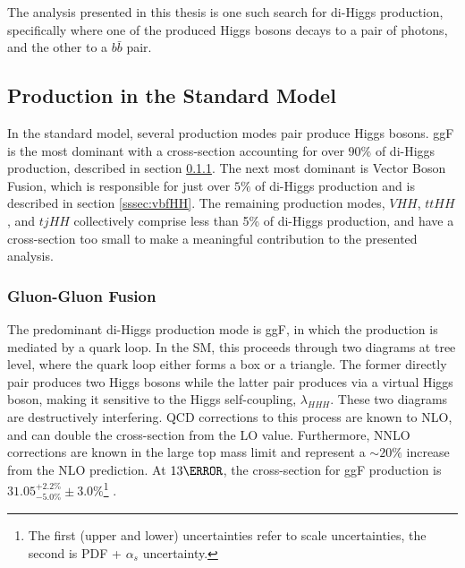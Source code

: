 The analysis presented in this thesis is one such search for di-Higgs production, specifically where one of the produced Higgs bosons decays to a pair of photons, and the other to a $b\bar{b}$ pair.

\subsection{Production in the Standard Model}
In the standard model, several production modes pair produce Higgs bosons. \gls{ggF} is the most dominant with a cross-section accounting for over $90\%$ of di-Higgs production, described in section \ref{sssec:ggfHH}. The next most dominant is Vector Boson Fusion, which is responsible for just over $5\%$ of di-Higgs production and is described in section \ref{sssec:vbfHH}. The remaining production modes, $VHH$, $ttHH$, and $tjHH$ collectively comprise less than 5\% of di-Higgs production, and have a cross-section too small to make a meaningful contribution to the presented analysis.

\subsubsection{Gluon-Gluon Fusion} \label{sssec:ggfHH}

The predominant di-Higgs production mode is \gls{ggF}, in which the production is mediated by a quark loop. In the \gls{SM}, this proceeds through two diagrams at tree level, where the quark loop either forms a box or a triangle. The former directly pair produces two Higgs bosons while the latter pair produces via a virtual Higgs boson, making it sensitive to the Higgs self-coupling, $\lambda_{HHH}$. These two diagrams are destructively interfering. QCD corrections to this process are known to \gls{NLO}, and can double the cross-section from the \gls{LO} value. Furthermore, \gls{NNLO} corrections are known in the large top mass limit and represent a $\sim 20\%$ increase from the \gls{NLO} prediction. At $\unit{13}{\TeV}$, the cross-section for \gls{ggF} production is $31.05^{+2.2\%}_{-5.0\%} \pm 3.0\%$\footnote{The first (upper and lower) uncertainties refer to scale uncertainties, the second is PDF + $\alpha_s$ uncertainty.}  \cite{hh-crosssections}.

